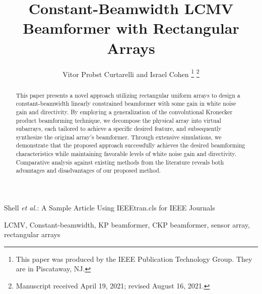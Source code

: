 \title{%
Constant-Beamwidth LCMV Beamformer with Rectangular Arrays}

\author{Vitor Probst Curtarelli and Israel Cohen%
\thanks{This paper was produced by the IEEE Publication Technology Group. They are in Piscataway, NJ.}%
\thanks{Manuscript received April 19, 2021; revised August 16, 2021.}}

%
{Shell \MakeLowercase{\textit{et al.}}: A Sample Article Using IEEEtran.cls for IEEE Journals}


\maketitle

\begin{abstract}
This paper presents a novel approach utilizing rectangular uniform arrays to design a constant-beamwidth linearly constrained beamformer with some gain in white noise gain and directivity. By employing a generalization of the convolutional Kronecker product beamforming technique, we decompose the physical array into virtual subarrays, each tailored to achieve a specific desired feature, and subsequently synthesize the original array's beamformer. Through extensive simulations, we demonstrate that the proposed approach successfully achieves the desired beamforming characteristics while maintaining favorable levels of white noise gain and directivity. Comparative analysis against existing methods from the literature reveals both advantages and disadvantages of our proposed method.
\end{abstract}

\begin{IEEEkeywords}
LCMV, Constant-beamwidth, KP beamformer, CKP beamformer, sensor array, rectangular arrays
\end{IEEEkeywords}